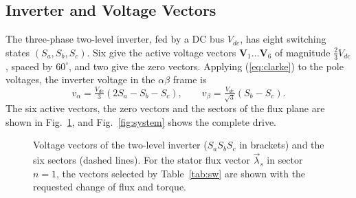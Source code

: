 \documentclass[12pt,a4paper,onecolumn]{IEEEtran}
\begin{document}
\subsection{Inverter and Voltage Vectors}
The three-phase two-level inverter, fed by a DC bus $V_{dc}$, has eight switching states $(S_a,S_b,S_c)$. Six give the active voltage vectors $\mathbf{V}_1\ldots\mathbf{V}_6$ of magnitude $\tfrac{2}{3}V_{dc}$, spaced by $60^\circ$, and two give the zero vectors. Applying (\ref{eq:clarke}) to the pole voltages, the inverter voltage in the $\alpha\beta$ frame is
\begin{equation}
v_\alpha = \tfrac{V_{dc}}{3}(2S_a - S_b - S_c), \qquad v_\beta = \tfrac{V_{dc}}{\sqrt3}(S_b - S_c). \label{eq:vab}
\end{equation}
The six active vectors, the zero vectors and the sectors of the flux plane are shown in Fig.~\ref{fig:hex}, and Fig.~\ref{fig:system} shows the complete drive.

\begin{figure}[!t]
\centering
{}
\caption{Voltage vectors of the two-level inverter ($S_aS_bS_c$ in brackets) and the six sectors (dashed lines). For the stator flux vector $\vec{\lambda}_s$ in sector $n=1$, the vectors selected by Table~\ref{tab:sw} are shown with the requested change of flux and torque.}
\label{fig:hex}
\end{figure}
\end{document}
